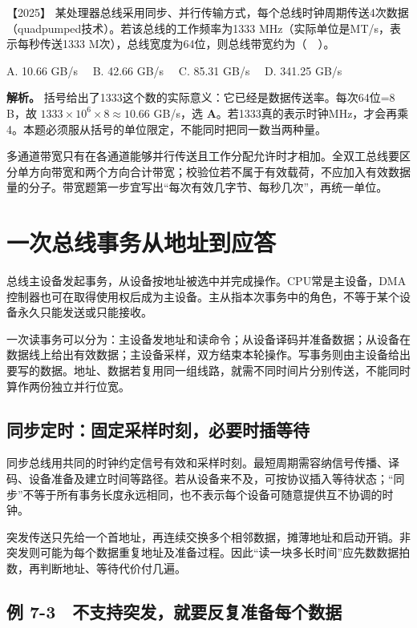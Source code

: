 \noindent{}【2025】 某处理器总线采用同步、并行传输方式，每个总线时钟周期传送4次数据（quadpumped技术）。若该总线的工作频率为1333 MHz（实际单位是MT/s，表示每秒传送1333 M次），总线宽度为64位，则总线带宽约为（　）。

A. 10.66 GB/s　 B. 42.66 GB/s　 C. 85.31 GB/s　 D. 341.25 GB/s


\textbf{解析。} 括号给出了1333这个数的实际意义：它已经是数据传送率。每次64位=8 B，故 \(1333\times10^6\times8\approx10.66\) GB/s，选 \textbf{A}。若1333真的表示时钟MHz，才会再乘4。本题必须服从括号的单位限定，不能同时把同一数当两种量。

多通道带宽只有在各通道能够并行传送且工作分配允许时才相加。全双工总线要区分单方向带宽和两个方向合计带宽；校验位若不属于有效载荷，不应加入有效数据量的分子。带宽题第一步宜写出``每次有效几字节、每秒几次''，再统一单位。

\section{一次总线事务从地址到应答}\label{co-07-02}

总线主设备发起事务，从设备按地址被选中并完成操作。CPU常是主设备，DMA控制器也可在取得使用权后成为主设备。主从指本次事务中的角色，不等于某个设备永久只能发送或只能接收。

一次读事务可以分为：主设备发地址和读命令；从设备译码并准备数据；从设备在数据线上给出有效数据；主设备采样，双方结束本轮操作。写事务则由主设备给出要写的数据。地址、数据若复用同一组线路，就需不同时间片分别传送，不能同时算作两份独立并行位宽。

\subsection{同步定时：固定采样时刻，必要时插等待}\label{co-c07-h39}

同步总线用共同的时钟约定信号有效和采样时刻。最短周期需容纳信号传播、译码、设备准备及建立时间等路径。若从设备来不及，可按协议插入等待状态；``同步''不等于所有事务长度永远相同，也不表示每个设备可随意提供互不协调的时钟。

突发传送只先给一个首地址，再连续交换多个相邻数据，摊薄地址和启动开销。非突发则可能为每个数据重复地址及准备过程。因此``读一块多长时间''应先数数据拍数，再判断地址、等待代价付几遍。

\subsection{例 7-3　不支持突发，就要反复准备每个数据}\label{co-ex7-3}

